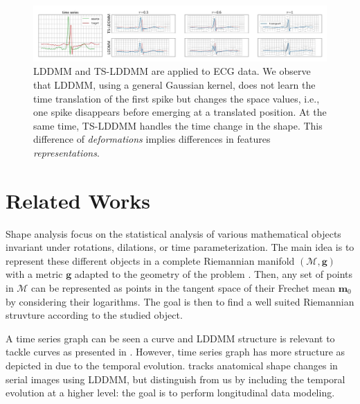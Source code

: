 \begin{figure}[t]
  \centering
  \includegraphics[width=\linewidth]{"./pictures/transport.jpeg"}
  
  \caption{LDDMM and TS-LDDMM are applied to ECG data.
  We observe that LDDMM, using a general Gaussian kernel, does not learn the time translation of the first spike but changes the space values, i.e., one spike disappears before emerging at a translated position. At the same time, TS-LDDMM handles the time change in the shape.
  This difference of \textit{deformations} implies differences in features \textit{representations}.   }
  \label{fig:transport}
  
\end{figure}

\section{Related Works}
Shape analysis focus on the statistical analysis of various mathematical objects invariant under rotations, dilations, or time parameterization.
 The main idea is to represent these different objects in a complete Riemannian manifold $(\mathcal{M},\mathbf{g})$ with a metric $\mathbf{g}$ adapted to the geometry of the problem \cite{miller2006geodesic}.
 Then, any set of points in $\mathcal{M}$ can be represented as points in the tangent space of their Frechet mean $\mathbf{m}_0$ \cite{pal2017riemannian,le2001locating} by considering their logarithms.
 The goal is then to find a well suited Riemannian struvture according to the studied object.

 A time series graph can be seen a curve and LDDMM structure is relevant to tackle curves as presented in \cite{glaunes2008large}. %
  However, time series graph has more structure as depicted in  due to the temporal evolution. 
  \cite{qiu2009time} tracks anatomical shape changes in serial images using LDDMM, but distinguish from us by including the temporal evolution at a higher level: the goal is to perform longitudinal data modeling.

